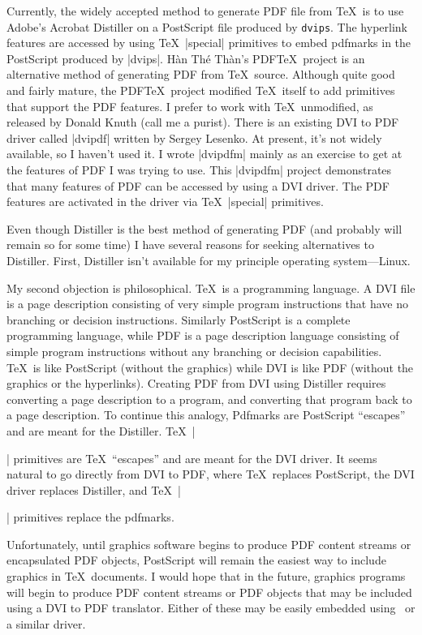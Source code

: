 Currently, the widely accepted method to generate PDF file from \TeX\
is to use Adobe's Acrobat Distiller on a PostScript
file produced by {\tt dvips}.
The hyperlink features are accessed by using \TeX\ |special| primitives
to embed pdfmarks in the PostScript produced by |dvips|.
H\`an Th\'e Th\`an's PDF\TeX\ project is an alternative method
of generating PDF from \TeX\ source.
Although quite good and fairly mature, the PDF\TeX\ project
modified \TeX\ itself to add primitives that support the PDF features.
I prefer to work with \TeX\ unmodified, as released by Donald Knuth
(call me a purist).
There is an existing DVI to PDF driver called
|dvipdf| written by Sergey Lesenko.  At present, it's not widely
available, so I haven't used it.  I wrote |dvipdfm|
mainly as an exercise to get at the features
of PDF I was trying to use.  This |dvipdfm| project demonstrates that many features
of PDF can be accessed by using a DVI driver.
The PDF features are activated in the driver via
\TeX\ |special| primitives.

Even though Distiller is the best method of generating PDF (and
probably will remain so for some time) I have several reasons for
seeking alternatives to Distiller.
First, Distiller isn't available for my principle operating
system---Linux.

My second objection is philosophical.
\TeX\ is a programming language.
A DVI file is a page description consisting of very
simple program instructions that have no branching or
decision instructions.
Similarly PostScript is a complete programming language,
while PDF is a page description language consisting
of simple program instructions
without any branching or decision capabilities.
\TeX\ is like PostScript (without the graphics)
while DVI is like PDF (without the graphics or the hyperlinks).
Creating PDF from DVI using Distiller requires converting a page description to a program,
and converting that program back to a page description.
To continue this analogy,
Pdfmarks are PostScript ``escapes'' and are meant for the Distiller.
\TeX\ |\special| primitives are \TeX\ ``escapes'' and are meant for the DVI driver.
It seems natural to go directly from DVI to PDF, where \TeX\ replaces
PostScript, the DVI driver replaces Distiller,
and \TeX\ |\special| primitives replace the pdfmarks.

Unfortunately, until graphics software
begins to produce PDF content streams or encapsulated
PDF objects, PostScript will remain the easiest
way to include graphics in \TeX\ documents.
I would hope that in the future, graphics programs
will begin to produce PDF content streams or PDF objects that
may be included using a DVI to PDF translator.  Either
of these may be easily embedded using \dvipdfm\ or a similar driver.

